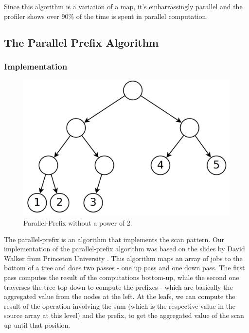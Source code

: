 \documentclass[10pt,journal]{IEEEtran}
\begin{document}
Since this algorithm is a variation of a map, it's embarrassingly parallel and the profiler shows over 90\% of the time is spent in parallel computation.

\subsection{The Parallel Prefix Algorithm}

\subsubsection{Implementation}

\begin{figure}[htbp]
	\centerline{\includegraphics[scale=0.15]{img/parprefix.png}}
	\caption{ Parallel-Prefix without a power of 2. }
	\label{parprefix}
\end{figure}

The parallel-prefix is an algorithm that implements the scan pattern. Our implementation of the parallel-prefix algorithm was based on the slides by David Walker from Princeton University \cite{parprefix}. This algorithm maps an array of jobs to the bottom of a tree and does two passes - one up pass and one down pass. The first pass computes the result of the computations bottom-up, while the second one traverses the tree top-down to compute the prefixes - which are basically the aggregated value from the nodes at the left. At the leafs, we can compute the result of the operation involving the sum (which is the respective value in the source array at this level) and the prefix, to get the aggregated value of the scan up until that position.
\end{document}

